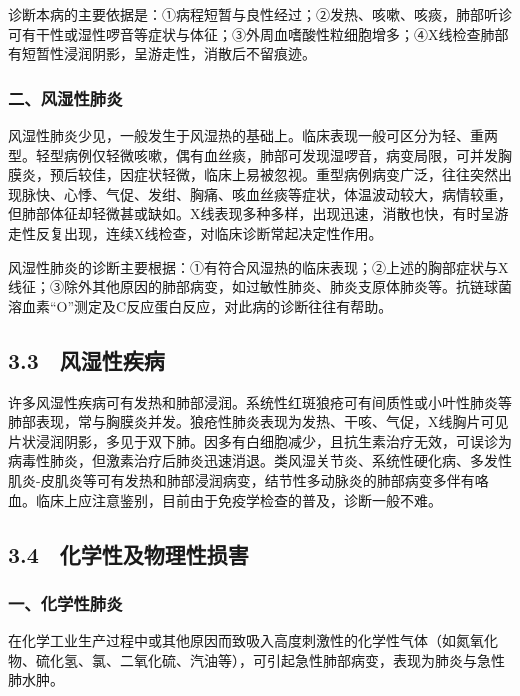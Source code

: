 诊断本病的主要依据是：①病程短暂与良性经过；②发热、咳嗽、咳痰，肺部听诊可有干性或湿性啰音等症状与体征；③外周血嗜酸性粒细胞增多；④X线检查肺部有短暂性浸润阴影，呈游走性，消散后不留痕迹。

\subsubsection{二、风湿性肺炎}

风湿性肺炎少见，一般发生于风湿热的基础上。临床表现一般可区分为轻、重两型。轻型病例仅轻微咳嗽，偶有血丝痰，肺部可发现湿啰音，病变局限，可并发胸膜炎，预后较佳，因症状轻微，临床上易被忽视。重型病例病变广泛，往往突然出现脉快、心悸、气促、发绀、胸痛、咳血丝痰等症状，体温波动较大，病情较重，但肺部体征却轻微甚或缺如。X线表现多种多样，出现迅速，消散也快，有时呈游走性反复出现，连续X线检查，对临床诊断常起决定性作用。

风湿性肺炎的诊断主要根据：①有符合风湿热的临床表现；②上述的胸部症状与X线征；③除外其他原因的肺部病变，如过敏性肺炎、肺炎支原体肺炎等。抗链球菌溶血素“O”测定及C反应蛋白反应，对此病的诊断往往有帮助。

\protect\hypertarget{text00027.html}{}{}

\subsection{3.3　风湿性疾病}

许多风湿性疾病可有发热和肺部浸润。系统性红斑狼疮可有间质性或小叶性肺炎等肺部表现，常与胸膜炎并发。狼疮性肺炎表现为发热、干咳、气促，X线胸片可见片状浸润阴影，多见于双下肺。因多有白细胞减少，且抗生素治疗无效，可误诊为病毒性肺炎，但激素治疗后肺炎迅速消退。类风湿关节炎、系统性硬化病、多发性肌炎-皮肌炎等可有发热和肺部浸润病变，结节性多动脉炎的肺部病变多伴有咯血。临床上应注意鉴别，目前由于免疫学检查的普及，诊断一般不难。

\protect\hypertarget{text00028.html}{}{}

\subsection{3.4　化学性及物理性损害}

\subsubsection{一、化学性肺炎}

在化学工业生产过程中或其他原因而致吸入高度刺激性的化学性气体（如氮氧化物、硫化氢、氯、二氧化硫、汽油等），可引起急性肺部病变，表现为肺炎与急性肺水肿。

